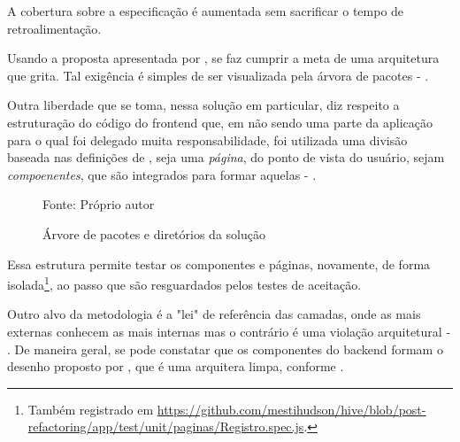   A cobertura sobre a especificação é aumentada sem sacrificar o tempo de retroalimentação.

  Usando a proposta apresentada por , se faz cumprir a meta de uma arquitetura que grita. Tal exigência é simples de ser visualizada pela árvora de pacotes - .

  Outra liberdade que se toma, nessa solução em particular, diz respeito a estruturação do código do frontend que, em não sendo uma parte da aplicação para o qual foi delegado muita responsabilidade, foi utilizada uma divisão baseada nas definições de , seja uma \emph{página}, do ponto de vista do usuário, sejam \emph{compoenentes}, que são integrados para formar aquelas - .

  \begin{figure}[htb!]
    \centering
    \caption{Árvore de pacotes e diretórios da solução}
    \small{Fonte: Próprio autor}
  \end{figure}

  Essa estrutura permite testar os componentes e páginas, novamente, de forma isolada\footnote{Também registrado em \url{https://github.com/mestihudson/hive/blob/post-refactoring/app/test/unit/paginas/Registro.spec.js}.}, ao passo que são resguardados pelos testes de aceitação.

  Outro alvo da metodologia é a "lei" de referência das camadas, onde as mais externas conhecem as mais internas mas o contrário é uma violação arquitetural - . De maneira geral, se pode constatar que os componentes do backend formam o desenho proposto por , que é uma arquitera limpa, conforme .
